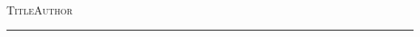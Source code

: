 \documentclass[12pt]{article}
\begin{document}
\thispagestyle{empty}

{\scshape\large Title}\hfill{\scshape Author}
\medskip\hrule\bigskip

\lipsum[2]
\bigskip

\lipsum[1]
\medskip
\lipsum[3]\lipsum[4]
\end{document}
